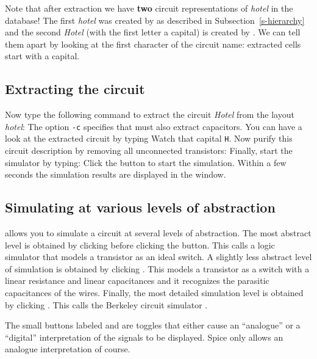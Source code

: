 Note that after extraction we have {\bf two} circuit representations of {\sl
hotel} in the database! The first {\sl hotel} was created by  as
described in Subsection~\ref{s-hierarchy} and the second {\sl Hotel} (with the
first letter a capital) is created by
. We can tell them apart by looking at the first character of the
circuit name: extracted cells start with a capital.

\subsection{Extracting the circuit}
\label{t-ex}
Now type the following command to extract the circuit {\sl Hotel} from the
layout {\sl hotel}:
The option {\tt -c} specifies that  must also extract capacitors.
You can have a look at the extracted circuit by typing
Watch that capital {\tt H}. Now purify this circuit description by removing all
unconnected transistors:
Finally, start the simulator by typing:
Click the  button to start the simulation. Within a few seconds the
simulation results are displayed in the  window.

\subsection{Simulating at various levels of abstraction}
 allows you to simulate a circuit at several levels of
abstraction. The most abstract level is obtained by clicking 
before clicking the  button. This calls a logic simulator that 
models a transistor as an ideal switch. A slightly less abstract
level of simulation is obtained by clicking . This models a
transistor as a switch with a linear resistance and linear capacitances and it
recognizes the parasitic capacitances of the wires. Finally, the most detailed
simulation level is obtained by clicking . This calls the
Berkeley circuit simulator .

The small buttons labeled  and  are toggles that either
cause an ``analogue'' or a ``digital'' interpretation of the signals to be
displayed. Spice only allows an analogue interpretation of course.

